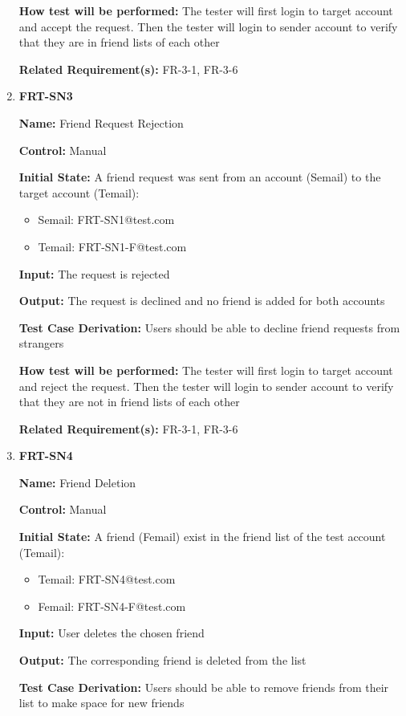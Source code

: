 \documentclass[12pt, titlepage]{article}
\begin{document}
\begin{enumerate}
\textbf{How test will be performed:} The tester will first login to target account and accept the request. Then the tester will login to sender account to verify that they are in friend lists of each other

\textbf{Related Requirement(s):} FR-3-1, FR-3-6

\item{\textbf{FRT-SN3}}

\textbf{Name:} Friend Request Rejection

\textbf{Control:} Manual
					
\textbf{Initial State:} A friend request was sent from an account (Semail) to the target account (Temail):
\begin{itemize}
\item Semail: FRT-SN1@test.com
\item Temail: FRT-SN1-F@test.com
\end{itemize}

\textbf{Input:} The request is rejected
					
\textbf{Output:} The request is declined and no friend is added for both accounts

\textbf{Test Case Derivation:} Users should be able to decline friend requests from strangers
					
\textbf{How test will be performed:} The tester will first login to target account and reject the request. Then the tester will login to sender account to verify that they are not in friend lists of each other

\textbf{Related Requirement(s):} FR-3-1, FR-3-6

\item{\textbf{FRT-SN4}}

\textbf{Name:} Friend Deletion

\textbf{Control:} Manual
					
\textbf{Initial State:} A friend (Femail) exist in the friend list of the test account (Temail):
\begin{itemize}
\item Temail: FRT-SN4@test.com
\item Femail: FRT-SN4-F@test.com
\end{itemize}

\textbf{Input:} User deletes the chosen friend
					
\textbf{Output:} The corresponding friend is deleted from the list

\textbf{Test Case Derivation:} Users should be able to remove friends from their list to make space for new friends
					

\end{enumerate}
\end{document}

